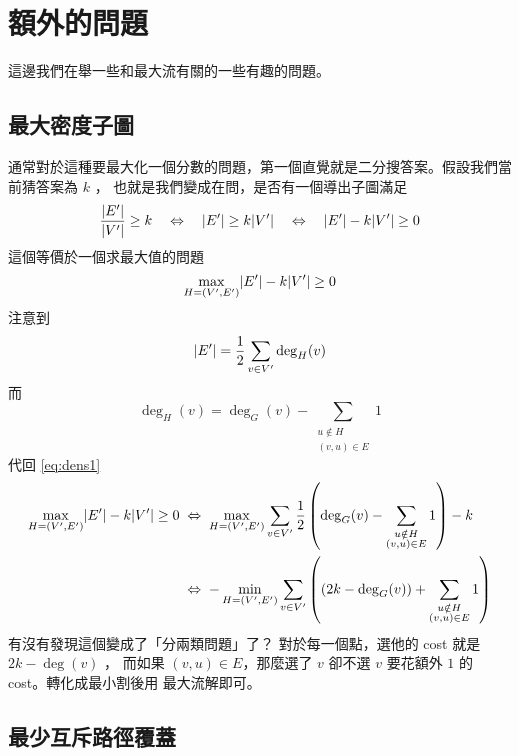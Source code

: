 \documentclass[a4paper,12pt]{book}
\begin{document}
\section{額外的問題}
這邊我們在舉一些和最大流有關的一些有趣的問題。

\subsection{最大密度子圖}

通常對於這種要最大化一個分數的問題，第一個直覺就是二分搜答案。假設我們當前猜答案為 $k$ ，
也就是我們變成在問，是否有一個導出子圖滿足
\[ \frac{\lvert E' \rvert}{\lvert V' \rvert} \geq k \quad \Leftrightarrow \quad \lvert E' \rvert \geq k \lvert V' \rvert 
  \quad \Leftrightarrow \quad \lvert E' \rvert - k \lvert V' \rvert \geq 0 \]
這個等價於一個求最大值的問題
\begin{equation}
\max_{H = (V', E')} \lvert E' \rvert - k \lvert V' \rvert \geq 0
\label{eq:dens1}
\end{equation}
注意到
\[ \lvert E' \rvert = \frac{1}{2} \sum_{v \in V'} \deg_H(v)  \]
而
\[ \deg_H(v) = \deg_G(v) - \sum_{\substack{u \notin H \\ (v, u) \in E}} 1 \]
代回 \eqref{eq:dens1} 
\begin{align*}
  \max_{H = (V', E')} \lvert E' \rvert - k \lvert V' \rvert \geq 0 \; & \Leftrightarrow \;
  \max_{H = (V', E')} \sum_{v \in V'} \frac{1}{2} \left( \deg_G(v) -
      \sum_{\substack{u \notin H \\ (v, u) \in E}} 1 \right) - k \\
    & \Leftrightarrow \; - \min_{H = (V', E')} \sum_{v \in V'} \left( \left(2k - \deg_G(v) \right) +
      \sum_{\substack{u \notin H \\ (v, u) \in E}} 1 \right) \\
\end{align*}
有沒有發現這個變成了「分兩類問題」了？ 對於每一個點，選他的 cost 就是 $2k - \deg(v)$ ，
而如果 $(v, u) \in E$，那麼選了 $v$ 卻不選 $v$ 要花額外 $1$ 的 cost。轉化成最小割後用
最大流解即可。

\subsection{最少互斥路徑覆蓋}
\end{document}
